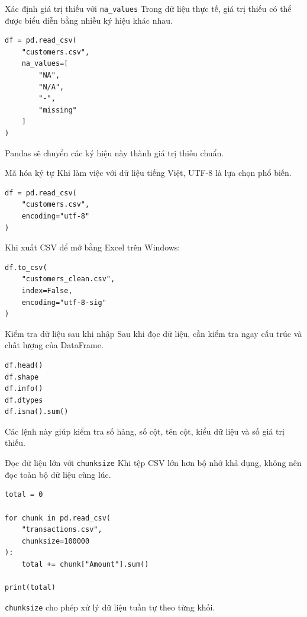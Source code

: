\documentclass[aspectratio=169,11pt]{beamer}
\newcommand{\code}[1]{\texttt{#1}}
\begin{document}
\begin{frame}[fragile]{Xác định giá trị thiếu với \code{na\_values}}
Trong dữ liệu thực tế, giá trị thiếu có thể được biểu diễn bằng nhiều ký hiệu khác nhau.

\begin{lstlisting}[style=pythonstyle]
df = pd.read_csv(
    "customers.csv",
    na_values=[
        "NA",
        "N/A",
        "-",
        "missing"
    ]
)
\end{lstlisting}

Pandas sẽ chuyển các ký hiệu này thành giá trị thiếu chuẩn.
\end{frame}

\begin{frame}[fragile]{Mã hóa ký tự}
Khi làm việc với dữ liệu tiếng Việt, UTF-8 là lựa chọn phổ biến.

\begin{lstlisting}[style=pythonstyle]
df = pd.read_csv(
    "customers.csv",
    encoding="utf-8"
)
\end{lstlisting}

Khi xuất CSV để mở bằng Excel trên Windows:
\begin{lstlisting}[style=pythonstyle]
df.to_csv(
    "customers_clean.csv",
    index=False,
    encoding="utf-8-sig"
)
\end{lstlisting}
\end{frame}

\begin{frame}[fragile]{Kiểm tra dữ liệu sau khi nhập}
Sau khi đọc dữ liệu, cần kiểm tra ngay cấu trúc và chất lượng của DataFrame.

\begin{lstlisting}[style=pythonstyle]
df.head()
df.shape
df.info()
df.dtypes
df.isna().sum()
\end{lstlisting}

Các lệnh này giúp kiểm tra số hàng, số cột, tên cột, kiểu dữ liệu và số giá trị thiếu.
\end{frame}

\begin{frame}[fragile]{Đọc dữ liệu lớn với \code{chunksize}}
Khi tệp CSV lớn hơn bộ nhớ khả dụng, không nên đọc toàn bộ dữ liệu cùng lúc.

\begin{lstlisting}[style=pythonstyle]
total = 0

for chunk in pd.read_csv(
    "transactions.csv",
    chunksize=100000
):
    total += chunk["Amount"].sum()

print(total)
\end{lstlisting}

\code{chunksize} cho phép xử lý dữ liệu tuần tự theo từng khối.
\end{frame}
\end{document}
